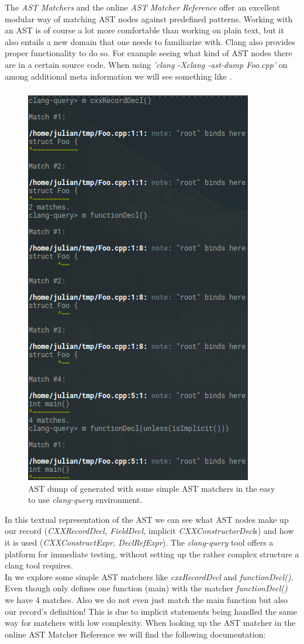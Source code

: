 The \textit{AST Matchers} and the online \textit{AST Matcher Reference} offer an excellent modular way of matching AST nodes against predefined patterns. Working with an AST is of course a lot more comfortable than working on plain text, but it also entails a new domain that one needs to familiarize with. Clang also provides proper functionality to do so. For example seeing what kind of AST nodes there are in a certain source code. When using \textit{'clang -Xclang -ast-dump Foo.cpp'} on  among additional meta information we will see something like .
\vspace{-0.9cm}
\subsubsection{}
\begin{figure}
	\centering
	\vspace{-20pt}
	\includegraphics[width=\linewidth, height=0.7\textwidth]{PICs/clang_query_foo_code}
	\caption{AST dump of  generated with some simple AST matchers in the easy to use \textit{clang-query} environment.}\label{foo_code_clang_query}
\end{figure}In this textual representation of the AST we can see what AST nodes make up our record (\textit{CXXRecordDecl, FieldDecl,} implicit \textit{CXXConstructorDecl}s) and how it is used (\textit{CXXConstructExpr, DeclRefExpr}). The \textit{clang-query} tool  offers a platform for immediate testing, without setting up the rather complex structure a clang tool requires.\\
In  we explore some simple AST matchers like \textit{cxxRecordDecl} and \textit{functionDecl()}. Even though  only defines one function (main) with the matcher \textit{functionDecl()} we have 4 matches. Also we do not even just match the main function but also our record's definition! This is due to implicit statements being handled the same way for matchers with low complexity. When looking up the AST matcher in the online AST Matcher Reference we will find the following documentation:\newline
